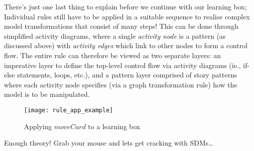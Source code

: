 There's just one last thing to explain before we continue with our learning box; Individual rules still have to be applied in a suitable sequence to realise
complex model transformations that consist of many steps! This can be done through simplified activity diagrams, where a single \emph{activity node}
 is a pattern (as discussed above) with \emph{activity edges}  which link to other nodes to form a control flow. The
entire rule can therefore be viewed as two separate layers: an imperative layer to define the top-level control flow via activity diagrams (ie., if-else
statements, loops, etc.), and a pattern layer comprised of story patterns where each activity node specifies (via a graph transformation rule) how the model is
to be manipulated.
\pagebreak

\begin{figure}[htp] 
\begin{center}
  \texttt{[image: rule\_app\_example]}
  \caption[]{Applying $moveCard$ to a learning box}
  \label{fig:rule_app_example}
\end{center}
\end{figure}

Enough theory! Grab your mouse and lets get cracking with SDMs\ldots